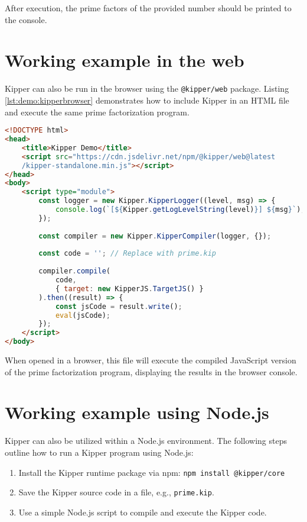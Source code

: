 After execution, the prime factors of the provided number should be printed to the console.

\section{Working example in the web}

Kipper can also be run in the browser using the \texttt{@kipper/web} package. Listing \ref{lst:demo:kipperbrowser} demonstrates how to include Kipper in an HTML file and execute the same prime factorization program.

\begin{lstlisting}[language=HTML,caption=Running Kipper in the browser, label=lst:demo:kipperbrowser]
<!DOCTYPE html>
<head>
	<title>Kipper Demo</title>
	<script src="https://cdn.jsdelivr.net/npm/@kipper/web@latest
	/kipper-standalone.min.js"></script>
</head>
<body>
	<script type="module">
		const logger = new Kipper.KipperLogger((level, msg) => {
			console.log(`[${Kipper.getLogLevelString(level)}] ${msg}`);
		});
		
		const compiler = new Kipper.KipperCompiler(logger, {});
		
		const code = ''; // Replace with prime.kip
		
		compiler.compile(
			code, 
			{ target: new KipperJS.TargetJS() }
		).then((result) => {
			const jsCode = result.write();
			eval(jsCode);
		});
	</script>
</body>
\end{lstlisting}

When opened in a browser, this file will execute the compiled JavaScript version of the prime factorization program, displaying the results in the browser console.

\section{Working example using Node.js}

Kipper can also be utilized within a Node.js environment. The following steps outline how to run a Kipper program using Node.js:

\begin{enumerate}
	\item Install the Kipper runtime package via npm: \lstinline|npm install @kipper/core|
	\item Save the Kipper source code in a file, e.g., \texttt{prime.kip}.
	\item Use a simple Node.js script to compile and execute the Kipper code.
\end{enumerate}

